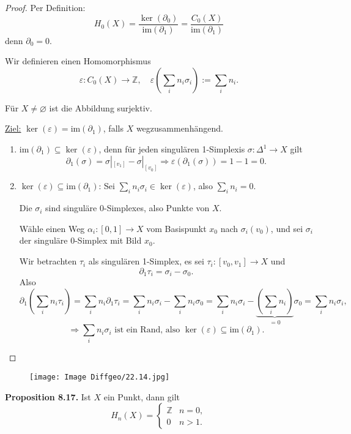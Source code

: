 \documentclass[fleqn, 12pt, letterpaper]{article}
\begin{document}
\begin{proof}
Per Definition:
\[
H_0(X) = \frac{\ker(\partial_0)}{\mathrm{im}(\partial_1)} = \frac{C_0(X)}{\mathrm{im}(\partial_1)}
\]
denn $\partial_0 = 0$.

Wir definieren einen Homomorphismus 
\[
\varepsilon : C_0(X) \to \mathbb{Z}, \quad \varepsilon\left( \sum_i n_i \sigma_i \right) := \sum_i n_i.
\]

Für $X \neq \varnothing$ ist die Abbildung surjektiv.

\underline{Ziel:} $\ker(\varepsilon) = \mathrm{im}(\partial_1)$, falls $X$ wegzusammenhängend.

\begin{enumerate}
    \item $\mathrm{im}(\partial_1) \subseteq \ker(\varepsilon)$, denn für jeden singulären 1-Simplexis $\sigma: \Delta^1 \to X$ gilt
    \[
    \partial_1(\sigma) = \sigma|_{[v_1]} - \sigma|_{[v_0]} \Rightarrow \varepsilon(\partial_1(\sigma)) = 1 - 1 = 0.
    \]

    \item $\ker(\varepsilon) \subseteq \mathrm{im}(\partial_1)$: Sei $\sum_i n_i \sigma_i \in \ker(\varepsilon)$, also $\sum_i n_i = 0$.

    Die $\sigma_i$ sind singuläre 0-Simplexes, also Punkte von $X$.

    Wähle einen Weg $\alpha_i: [0,1] \to X$ vom Basispunkt $x_0$ nach $\sigma_i(v_0)$, und sei $\sigma_i$ der singuläre 0-Simplex mit Bild $x_0$.

    Wir betrachten $\tau_i$ als singulären 1-Simplex, es sei $\tau_i : [v_0, v_1] \to X$ und 
\[
\partial_1 \tau_i = \sigma_i - \sigma_0.
\]
Also
\[
\partial_1 \left( \sum_i n_i \tau_i \right)
= \sum_i n_i \partial_1 \tau_i 
= \sum_i n_i \sigma_i - \sum_i n_i \sigma_0 
= \sum_i n_i \sigma_i - \underbrace{\left( \sum_i n_i \right) }_{=0}\sigma_0 
= \sum_i n_i \sigma_i, 
\]
\[
\Rightarrow \sum_i n_i \sigma_i \text{ ist ein Rand, also } \ker(\varepsilon) \subseteq \mathrm{im}(\partial_1).
\]
\end{enumerate}
\end{proof}
  \begin{figure}[H]
    \centering
    \texttt{[image: Image Diffgeo/22.14.jpg]}
 \end{figure}

\textbf{Proposition 8.17.} Ist $X$ ein Punkt, dann gilt
\[
H_n(X) =
\begin{cases}
\mathbb{Z} & n = 0, \\
0 & n > 1.
\end{cases}
\]
\end{document}
